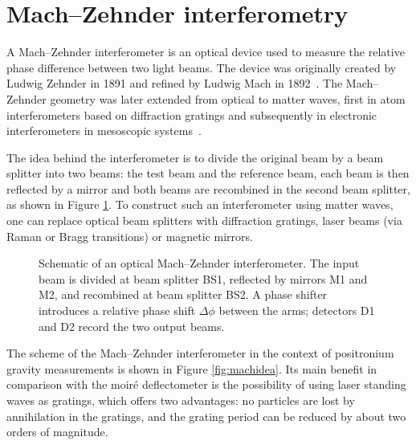 \documentclass[12pt]{report}
\begin{document}
\section{Mach--Zehnder interferometry}\label{sec:mach}

A Mach--Zehnder interferometer is an optical device used to measure the relative phase difference between two light beams.
The device was originally created by Ludwig Zehnder in 1891 and refined by Ludwig Mach in 1892~\cite{LudwigMach_1892}.
The Mach--Zehnder geometry was later extended from optical to matter waves, first in atom interferometers based on diffraction gratings and subsequently in electronic interferometers in mesoscopic systems~\cite{Cronin_Schmiedmayer_Pritchard_2009,Ji_Chung_Sprinzak_Heiblum_Mahalu_Shtrikman_2003}.

The idea behind the interferometer is to divide the original beam by a beam splitter into two beams: the test beam and the reference beam, each beam is then reflected by a mirror and both beams are recombined in the second beam splitter, as shown in Figure \ref{fig:mach-optical}.%
To construct such an interferometer using matter waves, one can replace optical beam splitters with diffraction gratings, laser beams (via Raman or Bragg transitions) or magnetic mirrors.

\begin{figure}[ht!]
\centering
\resizebox{0.7\textwidth}{!}{}
\caption[Optical Mach--Zehnder interferometer]{Schematic of an optical Mach--Zehnder interferometer. The input beam is divided at beam splitter BS1, reflected by mirrors M1 and M2, and recombined at beam splitter BS2. A phase shifter introduces a relative phase shift \(\Delta\phi\) between the arms; detectors D1 and D2 record the two output beams.}
\label{fig:mach-optical}
\end{figure}

The scheme of the Mach--Zehnder interferometer in the context of positronium gravity measurements is shown in Figure \ref{fig:machidea}. Its main benefit in comparison with the moir\'e deflectometer is the possibility of using laser standing waves as gratings, which offers two advantages: no particles are lost by annihilation in the gratings, and the grating period can be reduced by about two orders of magnitude. 
\end{document}
